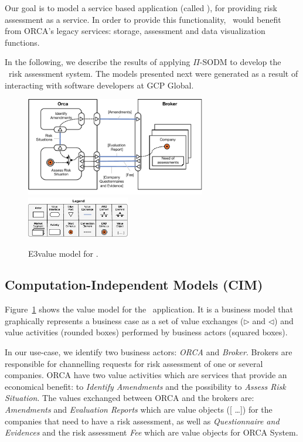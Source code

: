 Our goal is to model a service based application (called \FlyingPig), for providing risk assessment as a service.
In order to provide this functionality, \FlyingPig\ would benefit from ORCA's legacy services: storage, assessment and data visualization functions.

In the following, we describe the results of applying $\Pi$-SODM to develop the \FlyingPig\ risk assessment system.
The models presented next were generated as a result of interacting with software developers at GCP Global.

\begin{figure}
\centering
\includegraphics[width=0.7\textwidth]{figs/3ValueModel.pdf}
\hspace*{5cm}\includegraphics[width=0.4\textwidth]{figs/3ValueKey.pdf}
\caption{E3value model for \FlyingPig.\label{fig:E3valuemodel}}
\end{figure}


\subsection{Computation-Independent Models (CIM)}

Figure~\ref{fig:E3valuemodel} shows the value model for the \FlyingPig\ application.
It is a business model that graphically represents a business case as a set of value exchanges ($\triangleright$ and $\triangleleft$) and value activities (rounded boxes) performed by business actors (squared boxes).

In our use-case, we identify two business actors: \textsl{ORCA} and \textsl{Broker}. 
Brokers are responsible for channelling requests for risk assessment of one or several companies. 
ORCA have two value activities which are services that provide an economical benefit: to \textsl{Identify Amendments} and the possibility to \textsl{Assess Risk Situation}. 
The values exchanged between ORCA and the brokers are: \textsl{Amendments} and \textsl{Evaluation Reports} which are value objects ([ \!\dots]) for the companies that need to have a risk assessment, as well as  \textsl{Questionnaire and Evidences} and the risk assessment \textsl{Fee} which are value objects for ORCA System.



